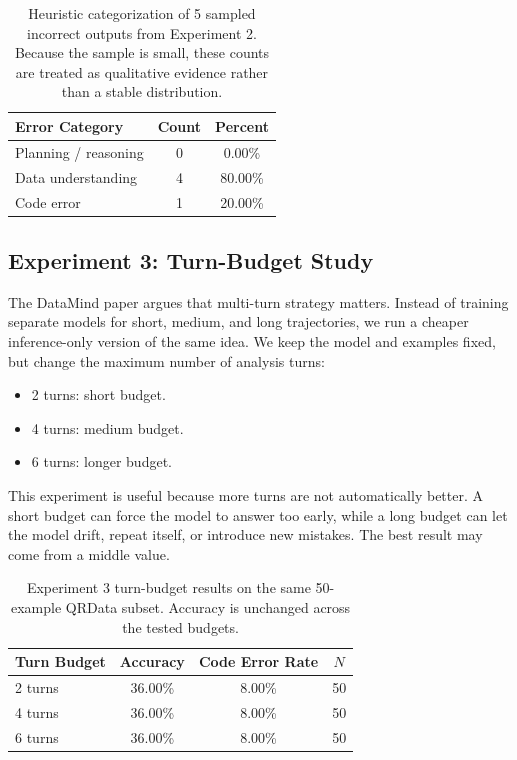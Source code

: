 \documentclass[11pt]{article}
\begin{document}
\begin{table}[t]
\centering
\small
\begin{tabular}{lcc}
\toprule
Error Category & Count & Percent \\
\midrule
Planning / reasoning & 0 & 0.00\% \\
Data understanding   & 4 & 80.00\% \\
Code error           & 1 & 20.00\% \\
\bottomrule
\end{tabular}
\caption{Heuristic categorization of 5 sampled incorrect outputs from Experiment 2. Because the sample is small, these counts are treated as qualitative evidence rather than a stable distribution.}
\label{tab:exp2errors}
\end{table}

\subsection{Experiment 3: Turn-Budget Study}

The DataMind paper argues that multi-turn strategy matters.
Instead of training separate models for short, medium, and long trajectories, we run a cheaper inference-only version of the same idea.
We keep the model and examples fixed, but change the maximum number of analysis turns:
\begin{itemize}
    \item 2 turns: short budget.
    \item 4 turns: medium budget.
    \item 6 turns: longer budget.
\end{itemize}

This experiment is useful because more turns are not automatically better.
A short budget can force the model to answer too early, while a long budget can let the model drift, repeat itself, or introduce new mistakes.
The best result may come from a middle value.

\begin{table}[t]
\centering
\small
\begin{tabular}{lccc}
\toprule
Turn Budget & Accuracy & Code Error Rate & $N$ \\
\midrule
2 turns & 36.00\% & 8.00\% & 50 \\
4 turns & 36.00\% & 8.00\% & 50 \\
6 turns & 36.00\% & 8.00\% & 50 \\
\bottomrule
\end{tabular}
\caption{Experiment 3 turn-budget results on the same 50-example QRData subset. Accuracy is unchanged across the tested budgets.}
\label{tab:exp3}
\end{table}
\end{document}
